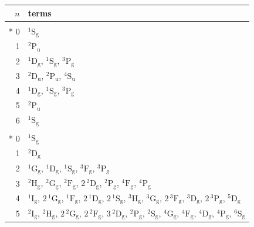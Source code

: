 \documentclass[10pt,a4paper]{article}
\makeatletter
\def\grouprule#1#2{\noalign{\marks\LTgroupmarks{\the\belowrulesep}\nobreak\vskip#1%
  \vskip\aboverulesep}\multispan\LT@cols\unskip{\leaders\hrule\@height#2\hfill\kern\z@}\cr
  \noalign{\penalty\LTrulebreak\vskip\belowrulesep\global\@lastruleclass\z@}}
\numberwithin{equation}{section}
\newcommand{\spec}[1]{\mathrm{#1}}
\newcommand{\ptag}[1]{\mathrm{#1}}
\newcommand{\orbital}[1]{\mathrm{#1}}
\newcommand{\term}[2]{{}^{#1}#2}
\newlength{\fillwidth}\newlength{\cellwidth}\newlength{\colwidth}
\newcommand{\cellmax}[1]{\settowidth{\cellwidth}{#1}%
  \ifdim\cellwidth>\colwidth\setlength{\colwidth}{\cellwidth}\fi}
\makeatother
\begin{document}
{\small\setlength{\fillwidth}{\textwidth}\addtolength{\fillwidth}{-2\tabcolsep}\setlength{\colwidth}{0pt}\cellmax{10}\cellmax{11}\cellmax{12}\cellmax{13}\cellmax{14}\cellmax{$n$}\cellmax{0}\cellmax{1}\cellmax{2}\cellmax{3}\cellmax{4}\cellmax{5}\cellmax{6}\cellmax{7}\cellmax{8}\cellmax{9}\addtolength{\fillwidth}{-\colwidth}\begin{longtable}{@{}r>{\RaggedRight\arraybackslash}p{\fillwidth}@{}}\toprule
$n$ & terms\\\midrule\endhead
\bottomrule\endfoot\endlastfoot
\multicolumn{2}{@{}c@{}}{$\orbital{p}^{n}$, $l = 1$}\\*
0 & $\term{1}{\spec{S}_{\ptag{g}}}$\\
1 & $\term{2}{\spec{P}_{\ptag{u}}}$\\
2 & $\term{1}{\spec{D}_{\ptag{g}}}$, $\term{1}{\spec{S}_{\ptag{g}}}$, $\term{3}{\spec{P}_{\ptag{g}}}$\\
3 & $\term{2}{\spec{D}_{\ptag{u}}}$, $\term{2}{\spec{P}_{\ptag{u}}}$, $\term{4}{\spec{S}_{\ptag{u}}}$\\
4 & $\term{1}{\spec{D}_{\ptag{g}}}$, $\term{1}{\spec{S}_{\ptag{g}}}$, $\term{3}{\spec{P}_{\ptag{g}}}$\\
5 & $\term{2}{\spec{P}_{\ptag{u}}}$\\
6 & $\term{1}{\spec{S}_{\ptag{g}}}$\\
\grouprule{0pt}{\lightrulewidth}\multicolumn{2}{@{}c@{}}{$\orbital{d}^{n}$, $l = 2$}\\*
0 & $\term{1}{\spec{S}_{\ptag{g}}}$\\
1 & $\term{2}{\spec{D}_{\ptag{g}}}$\\
2 & $\term{1}{\spec{G}_{\ptag{g}}}$, $\term{1}{\spec{D}_{\ptag{g}}}$, $\term{1}{\spec{S}_{\ptag{g}}}$, $\term{3}{\spec{F}_{\ptag{g}}}$, $\term{3}{\spec{P}_{\ptag{g}}}$\\
3 & $\term{2}{\spec{H}_{\ptag{g}}}$, $\term{2}{\spec{G}_{\ptag{g}}}$, $\term{2}{\spec{F}_{\ptag{g}}}$, $2\,\term{2}{\spec{D}_{\ptag{g}}}$, $\term{2}{\spec{P}_{\ptag{g}}}$, $\term{4}{\spec{F}_{\ptag{g}}}$, $\term{4}{\spec{P}_{\ptag{g}}}$\\
4 & $\term{1}{\spec{I}_{\ptag{g}}}$, $2\,\term{1}{\spec{G}_{\ptag{g}}}$, $\term{1}{\spec{F}_{\ptag{g}}}$, $2\,\term{1}{\spec{D}_{\ptag{g}}}$, $2\,\term{1}{\spec{S}_{\ptag{g}}}$, $\term{3}{\spec{H}_{\ptag{g}}}$, $\term{3}{\spec{G}_{\ptag{g}}}$, $2\,\term{3}{\spec{F}_{\ptag{g}}}$, $\term{3}{\spec{D}_{\ptag{g}}}$, $2\,\term{3}{\spec{P}_{\ptag{g}}}$, $\term{5}{\spec{D}_{\ptag{g}}}$\\
5 & $\term{2}{\spec{I}_{\ptag{g}}}$, $\term{2}{\spec{H}_{\ptag{g}}}$, $2\,\term{2}{\spec{G}_{\ptag{g}}}$, $2\,\term{2}{\spec{F}_{\ptag{g}}}$, $3\,\term{2}{\spec{D}_{\ptag{g}}}$, $\term{2}{\spec{P}_{\ptag{g}}}$, $\term{2}{\spec{S}_{\ptag{g}}}$, $\term{4}{\spec{G}_{\ptag{g}}}$, $\term{4}{\spec{F}_{\ptag{g}}}$, $\term{4}{\spec{D}_{\ptag{g}}}$, $\term{4}{\spec{P}_{\ptag{g}}}$, $\term{6}{\spec{S}_{\ptag{g}}}$\\

\end{longtable}}
\end{document}

